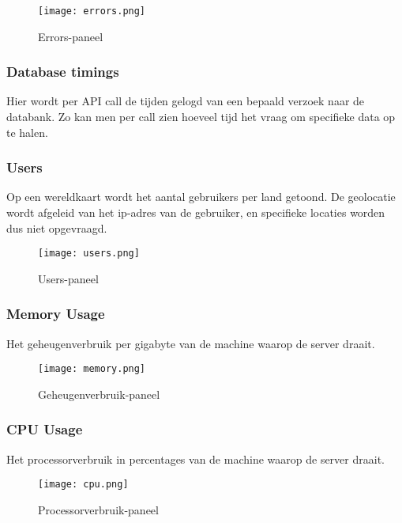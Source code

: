 \begin{figure}[h]
	\centering
	\texttt{[image: errors.png]}
	\caption{Errors-paneel}
	\label{fig:errors}
\end{figure}

\subsubsection{Database timings}
\label{sec:dbtimings}
Hier wordt per API call de tijden gelogd van een bepaald verzoek naar de databank. Zo kan men per call zien hoeveel tijd het vraag om specifieke data op te halen.


\subsubsection{Users}
\label{sec:users}
Op een wereldkaart wordt het aantal gebruikers per land getoond. De geolocatie wordt afgeleid van het ip-adres van de gebruiker, en specifieke locaties worden dus niet opgevraagd.

\begin{figure}[h]
	\centering
	\texttt{[image: users.png]}
	\caption{Users-paneel}
	\label{fig:users}
\end{figure}

\subsubsection{Memory Usage}
\label{sec:memory}
Het geheugenverbruik per gigabyte van de machine waarop de server draait.
\begin{figure}[h]
	\centering
	\texttt{[image: memory.png]}
	\caption{Geheugenverbruik-paneel}
	\label{fig:mem}
\end{figure}

\subsubsection{CPU Usage}
\label{sec:cpu}
Het processorverbruik in percentages van de machine waarop de server draait.

\begin{figure}[h]
	\centering
	\texttt{[image: cpu.png]}
	\caption{Processorverbruik-paneel}
	\label{fig:cpu}
\end{figure}

